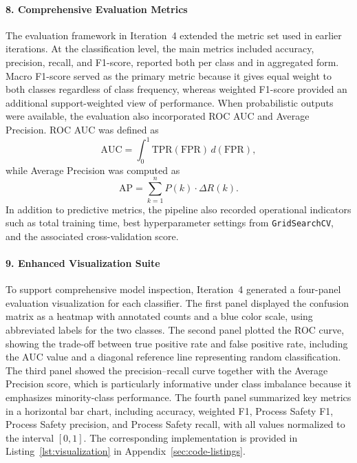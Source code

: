 \documentclass[11pt, titlepage, bibliography=totoc]{scrreprt}
\begin{document}
\paragraph{8. Comprehensive Evaluation Metrics}
The evaluation framework in Iteration~4 extended the metric set used in earlier iterations. At the classification level, the main metrics included accuracy, precision, recall, and F1-score, reported both per class and in aggregated form. Macro F1-score served as the primary metric because it gives equal weight to both classes regardless of class frequency, whereas weighted F1-score provided an additional support-weighted view of performance. When probabilistic outputs were available, the evaluation also incorporated ROC AUC and Average Precision. ROC AUC was defined as
\begin{equation}
\text{AUC} = \int_{0}^{1} \text{TPR}(\text{FPR}) \, d(\text{FPR}),
\end{equation}
while Average Precision was computed as
\begin{equation}
\text{AP} = \sum_{k=1}^{n} P(k) \cdot \Delta R(k).
\end{equation}
In addition to predictive metrics, the pipeline also recorded operational indicators such as total training time, best hyperparameter settings from \texttt{GridSearchCV}, and the associated cross-validation score.

\paragraph{9. Enhanced Visualization Suite}
To support comprehensive model inspection, Iteration~4 generated a four-panel evaluation visualization for each classifier. The first panel displayed the confusion matrix as a heatmap with annotated counts and a blue color scale, using abbreviated labels for the two classes. The second panel plotted the ROC curve, showing the trade-off between true positive rate and false positive rate, including the AUC value and a diagonal reference line representing random classification. The third panel showed the precision--recall curve together with the Average Precision score, which is particularly informative under class imbalance because it emphasizes minority-class performance. The fourth panel summarized key metrics in a horizontal bar chart, including accuracy, weighted F1, Process Safety F1, Process Safety precision, and Process Safety recall, with all values normalized to the interval $[0,1]$. The corresponding implementation is provided in Listing~\ref{lst:visualization} in Appendix~\ref{sec:code-listings}.
\end{document}
